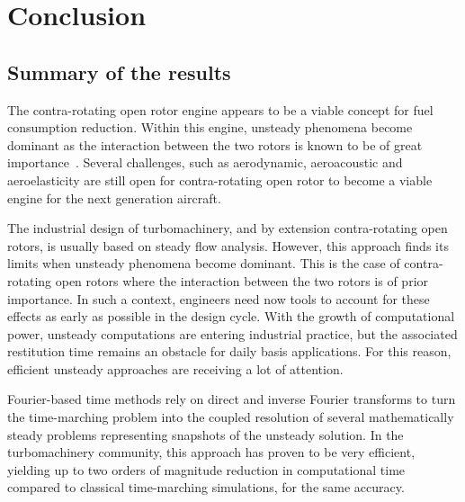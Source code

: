 
\chapter*{Conclusion}

\section*{Summary of the results}
\label{sec:perspectives}


The contra-rotating open rotor engine appears to be 
a viable concept for fuel consumption reduction. Within this engine,
unsteady phenomena become dominant as the interaction between the
two rotors is known to be of great 
importance~\cite{Stuermer2008, Peters2012, Francois2013}. 
Several challenges, such as aerodynamic,
aeroacoustic and aeroelasticity are still open 
for contra-rotating open rotor
to become a viable engine for the next generation aircraft.

The industrial design of turbomachinery, and by extension contra-rotating
open rotors, is usually based on steady flow analysis. 
However, this approach finds its limits 
when unsteady phenomena become dominant. This is the case of 
contra-rotating open rotors where the interaction between the
two rotors is of prior importance. In such a
context, engineers need now tools to account for these effects as
early as possible in the design cycle. With the growth of
computational power, unsteady computations are entering industrial
practice, but the associated restitution time remains an obstacle for
daily basis applications.  For this reason, efficient
unsteady approaches are receiving a lot of attention. 

Fourier-based time methods rely on direct and inverse Fourier transforms
to turn the time-marching problem into the coupled resolution of several
mathematically steady problems representing snapshots of the unsteady
solution. In the turbomachinery community, this approach has
proven to be very efficient, yielding up to two orders of
magnitude reduction in computational time compared to classical
time-marching simulations, for the same accuracy. 

